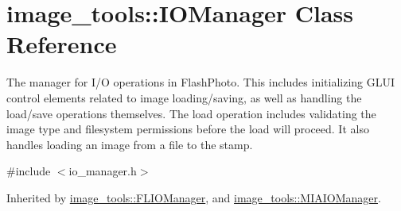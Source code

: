 \hypertarget{classimage__tools_1_1IOManager}{}\section{image\+\_\+tools\+:\+:I\+O\+Manager Class Reference}
\label{classimage__tools_1_1IOManager}


The manager for I/O operations in Flash\+Photo. This includes initializing G\+L\+UI control elements related to image loading/saving, as well as handling the load/save operations themselves. The load operation includes validating the image type and filesystem permissions before the load will proceed. It also handles loading an image from a file to the stamp.  




{\ttfamily \#include $<$io\+\_\+manager.\+h$>$}



Inherited by \hyperlink{classimage__tools_1_1FLIOManager}{image\+\_\+tools\+::\+F\+L\+I\+O\+Manager}, and \hyperlink{classimage__tools_1_1MIAIOManager}{image\+\_\+tools\+::\+M\+I\+A\+I\+O\+Manager}.


